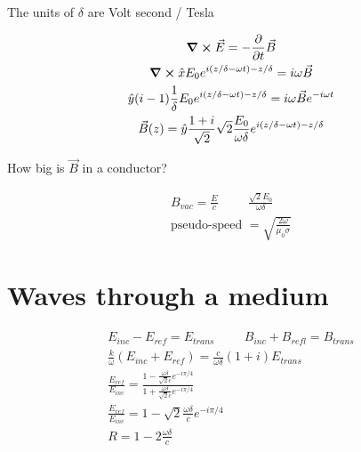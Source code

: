 \documentclass[fleqn]{report}
\newcommand{\hp}{\hspace{1cm}}
\newcommand{\del}{\partial}
\newcommand{\equations} [1] {
\begin{gather*}
#1
\end{gather*}
}
\begin{document}
The units of $\delta$ are Volt second / Tesla

\equations{
    \curl \vec E 
    =
    - \frac{\del}{\del t}
    \vec B 
    \\
    \curl \hat x E_0 e^{i(z / \delta - \omega t) - z / \delta}
    =
    i \omega \vec B 
    \\
    \hat y (i - 1) \frac{1}{\delta} E_0 e^{i(z / \delta - \omega t) - z / \delta}
    =
    i \omega \vec B e^{-i \omega t}
    \\
    \vec B(z)
    =
    \hat y \frac{1 + i}{\sqrt{2}}
    \sqrt{2}
    \frac{E_0}{\omega \delta}
    e^{i(z / \delta - \omega t) - z / \delta}
}


How big is $\vec B$ in a conductor? 

\equations{
    B_{vac} = \frac{E}{c}
    \hp 
    \frac{\sqrt{2} E_0}{\omega \delta}
    \\ 
    \textrm{pseudo-speed }
    =
    \sqrt{\frac{2 \omega}{\mu_0 \sigma }}
}

\section{Waves through a medium}
\equations{
    E_{inc} - E_{ref} = E_{trans}
    \hp 
    B_{inc} + B_{refl} = B_{trans} 
    \\
    \frac{k}{\omega}
    \left(
        E_{inc}
        +
        E_{ref}
    \right)
    =
    \frac{c}{\omega \delta}
    (1 + i)
    E_{trans}
    \\
    \frac{E_{ref}}{E_{inc}}
    =
    \frac{1 - \frac{\omega \delta}{\sqrt{2} c} e^{-i \pi / 4}}
    {1 + \frac{\omega \delta}{\sqrt{2} c} e^{-i \pi / 4}}
    \\
    \frac{E_{ref}}{E_{inc}}
    =
    1 - \sqrt{2} \frac{\omega \delta}{c} e^{-i \pi / 4}
    \\
    R = 1 - 2 \frac{\omega \delta}{c}
}
\end{document}
